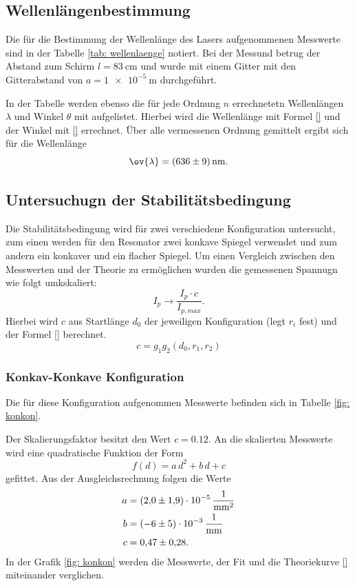 \subsection{Wellenlängenbestimmung}
Die für die Bestimmung der Wellenlänge des Lasers aufgenommenen Messwerte sind
in der Tabelle \ref{tab: wellenlaenge} notiert. Bei der Messund betrug der Abstand zum Schirm $l=\SI{83}{\centi\meter}$
und wurde mit einem Gitter mit den Gitterabstand von $a=\SI{1e-5}{\meter}$ durchgeführt.

In der Tabelle werden ebenso die für jede Ordnung $n$ errechnetetn Wellenlängen $\lambda$ und Winkel $\theta$
mit aufgelistet. Hierbei wird die Wellenlänge mit Formel \eqref{} und der Winkel mit \eqref{} errechnet.
Über alle vermessenen Ordnung gemittelt ergibt sich für die Wellenlänge
\begin{equation}
  \label{eq: mittelwert_wellenlaenge}
  \ov{\lambda}=\SI{636\pm9}{\nano\meter}.
\end{equation}

\subsection{Untersuchugn der Stabilitätsbedingung}
Die Stabilitätsbedingung wird für zwei verschiedene Konfiguration untersucht,
zum einen werden für den Resonator zwei konkave Spiegel verwendet und zum andern
ein konkaver und ein flacher Spiegel.
Um einen Vergleich zwischen den Messwerten und der Theorie zu ermöglichen wurden die gemessenen
Spannugn wie folgt umkskaliert:
\begin{equation*}
  I_p \rightarrow \frac{I_p\cdot c}{I_{p,max}}.
\end{equation*}
Hierbei wird $c$ aus Startlänge $d_0$ der jeweiligen Konfiguration (legt $r_i$ fest) und der Formel
\eqref{} berechnet.
\begin{equation*}
  c=g_1g_2(d_0, r_1, r_2)
\end{equation*}

\subsubsection{Konkav-Konkave Konfiguration}

Die für diese Konfiguration aufgenommen Messwerte befinden sich in Tabelle \ref{fig: konkon}.

Der Skalierungsfaktor besitzt den Wert $c=\num{0.12}$.
An die skalierten Messwerte wird eine quadratische Funktion der Form
\begin{equation*}
  f(d)=a\,d^2+b\,d+c
\end{equation*}
gefittet. Aus der Ausgleichsrechnung folgen die Werte
\begin{align}
  \label{eq: fit_konkon}
  \begin{aligned}
    a&=\SI{2.0\pm 1.9 e-5}{\per\square\milli\meter}\\
    b&=\SI{-6\pm5 e-3}{\per\milli\meter}\\
    c&=\num{0.47\pm0.28}.
  \end{aligned}
\end{align}
In der Grafik \ref{fig: konkon} werden die Messwerte, der Fit und die Theoriekurve \eqref{} miteinander verglichen.

